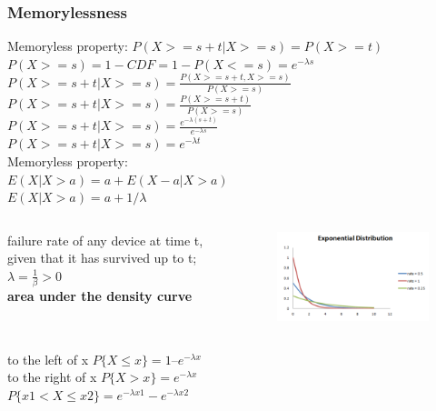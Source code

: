 \documentclass{beamer}
\begin{document}
\begin{frame}\frametitle{Memorylessness}
Memoryless property: $P(X>=s+t | X>=s) = P(X>=t) $ \\
$P(X>=s) = 1-CDF = 1-P(X<=s) = e^{-\lambda s}$ \\
$P(X>=s+t | X>=s) = \frac{P(X>=s+t, X>=s)}{P(X>=s)}$ \\
$P(X>=s+t | X>=s) = \frac{P(X>=s+t)}{P(X>=s)}$ \\
$P(X>=s+t | X>=s) = \frac{e^{-\lambda (s+t)}}{ e^{-\lambda s}}$ \\
$P(X>=s+t | X>=s) = e^{-\lambda t}$ \\
Memoryless property: \\
$E(X|X>a) = a+E(X-a|X>a)$ \\
$E(X|X>a) = a+ 1/\lambda$ \\

\end{frame}


\begin{frame}%
\begin{columns}
\begin{column}{0.45\textwidth}
failure rate of any device at time t, given that it has survived up to t; $\lambda = \frac{1}{\beta} > 0 $
\\ 
\textbf{area under the density curve}
\end{column}
\begin{column}{0.5\textwidth}
\begin{figure}
\includegraphics[scale=0.5]{exponential}
\end{figure}
\end{column}
\end{columns}
to the left of x
$P\{X \leq x\} = 1 – e^{-\lambda x}$
\\ to the right of x $P\{X > x\} = e^{-\lambda x}$
\\
$P\{x1 < X \leq x2\} = e^{-\lambda x1} - e^{-\lambda x2}$

\end{frame}
\end{document}
